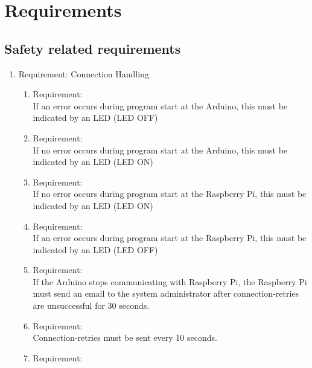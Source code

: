 \section{Requirements}
\label{chapter4}



\subsection{Safety related requirements}

	\begin{enumerate}[label*=\arabic*.]
		\item \label{req.1}  Requirement: Connection Handling \\
		\begin{enumerate}[label*=\arabic*.]
			\item \label{req.1.1}  Requirement:  \\
			If an error occurs during program start at the Arduino, this must be indicated by an LED (LED OFF)\\ 
			\item \label{req.1.2} Requirement:   \\
			If no error occurs during program start at the Arduino, this must be indicated by an LED (LED ON)\\ 
			\item \label{req.1.3} Requirement:   \\
			If no error occurs during program start at the Raspberry Pi, this must be indicated by an LED (LED ON)\\    
			\item \label{req.1.4} Requirement:   \\
			If an error occurs during program start at the Raspberry Pi, this must be indicated by an LED (LED OFF)\\    
			\item \label{req.1.5} Requirement:   \\
			If the Arduino stops communicating with Raspberry Pi, the Raspberry Pi must send an email to the system administrator after connection-retries are unsuccessful for 30 seconds.\\    
   			\item \label{req.1.6} Requirement:   \\
            Connection-retries must be sent every 10 seconds.\\
			\item \label{req.1.7} Requirement:   \\

\end{enumerate}
\end{enumerate}
